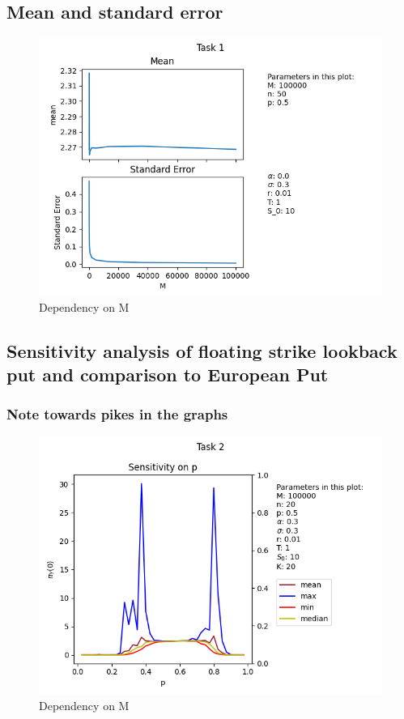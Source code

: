 \newpage
\subsection{Mean and standard error}

\begin{figure}[!h]
    \centering
    \includegraphics[width=0.7\linewidth]{pictures/task1.png}
    \caption{Dependency on M}
    \label{fig:task1}
\end{figure}


\newpage
\subsection{Sensitivity analysis of floating strike lookback put and comparison to European Put}

\subsubsection{Note towards pikes in the graphs}
\begin{figure}[!h]
    \centering
    \includegraphics[width=0.7\linewidth]{pictures/spike_evaluation.png}
    \caption{Dependency on M}
    \label{fig:spike}
\end{figure}

